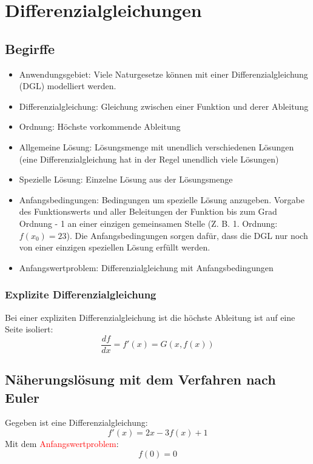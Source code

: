 \section{Differenzialgleichungen}
\subsection{Begirffe}
\begin{itemize}
  \item Anwendungsgebiet: Viele Naturgesetze können mit einer
    Differenzialgleichung (DGL) modelliert werden.
  \item Differenzialgleichung: Gleichung zwischen einer Funktion und
    derer Ableitung
  \item Ordnung: Höchste vorkommende Ableitung
  \item Allgemeine Lösung: Lösungsmenge mit unendlich verschiedenen
    Lösungen (eine Differenzialgleichung hat in der Regel unendlich viele Lösungen)
  \item Spezielle Lösung: Einzelne Lösung aus der Lösungsmenge
  \item Anfangsbedingungen: Bedingungen um spezielle Lösung anzugeben.
    Vorgabe des Funktionswerts und aller Beleitungen der Funktion bis zum
    Grad Ordnung - 1 an einer einzigen gemeinsamen Stelle (Z. B. 1.
    Ordnung: $f(x_0) = 23$). Die Anfangsbedingungen sorgen dafür, dass
    die DGL nur noch von einer einzigen speziellen Lösung erfüllt
    werden.
  \item Anfangswertproblem: Differenzialgleichung mit Anfangsbedingungen
\end{itemize}

\subsubsection{Explizite Differenzialgleichung}
Bei einer expliziten Differenzialgleichung ist die höchste Ableitung ist
auf eine Seite isoliert:
\[ \frac{df}{dx} = f'(x) = G(x, f(x)) \]

\subsection{Näherungslösung mit dem Verfahren nach Euler}
Gegeben ist eine Differenzialgleichung:
\[ f'(x) = 2x - 3f(x) + 1 \]
Mit dem \textcolor{red}{Anfangswertproblem}:
\[ f(0) = 0 \]

